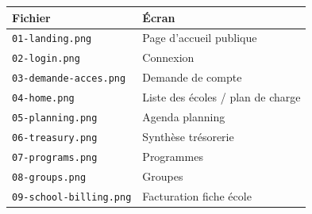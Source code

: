 \begin{table}[htbp]
  \centering
  \begin{tabular}{@{}ll@{}}
    \toprule
    \textbf{Fichier} & \textbf{Écran} \\
    \midrule
    \texttt{01-landing.png} & Page d'accueil publique \\
    \texttt{02-login.png} & Connexion \\
    \texttt{03-demande-acces.png} & Demande de compte \\
    \texttt{04-home.png} & Liste des écoles / plan de charge \\
    \texttt{05-planning.png} & Agenda planning \\
    \texttt{06-treasury.png} & Synthèse trésorerie \\
    \texttt{07-programs.png} & Programmes \\
    \texttt{08-groups.png} & Groupes \\
    \texttt{09-school-billing.png} & Facturation fiche école \\
    \bottomrule
  \end{tabular}
\end{table}
